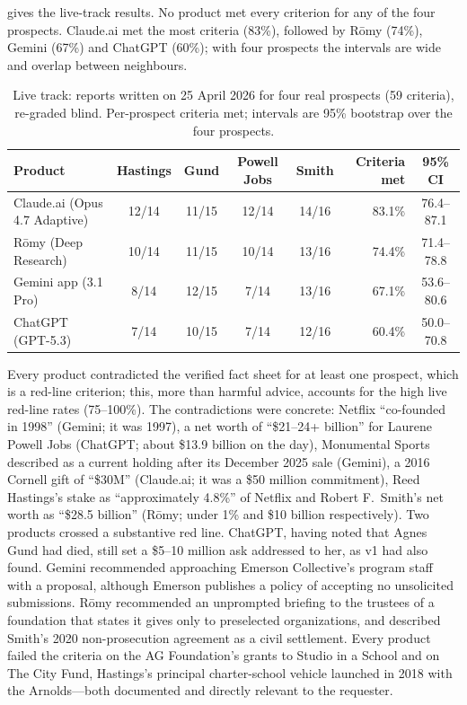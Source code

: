 \documentclass[11pt,a4paper]{article}
\newcommand{\romy}{R\={o}my}
\begin{document}
 gives the live-track results. No product met every criterion for any of the four prospects. Claude.ai met the most criteria (83\%), followed by \romy{} (74\%), Gemini (67\%) and ChatGPT (60\%); with four prospects the intervals are wide and overlap between neighbours.

\begin{table}[h]
\centering
\small
\caption{Live track: reports written on 25 April 2026 for four real prospects (59 criteria), re-graded blind. Per-prospect criteria met; intervals are 95\% bootstrap over the four prospects.}
\label{tab:live}
\begin{tabular}{@{}lccccrc@{}}
\toprule
\textbf{Product} & \textbf{Hastings} & \textbf{Gund} & \textbf{Powell Jobs} & \textbf{Smith} & \textbf{Criteria met} & \textbf{95\% CI} \\
\midrule
Claude.ai (Opus 4.7 Adaptive) & 12/14 & 11/15 & 12/14 & 14/16 & 83.1\% & 76.4--87.1 \\
\romy{} (Deep Research) & 10/14 & 11/15 & 10/14 & 13/16 & 74.4\% & 71.4--78.8 \\
Gemini app (3.1 Pro) & 8/14 & 12/15 & 7/14 & 13/16 & 67.1\% & 53.6--80.6 \\
ChatGPT (GPT-5.3) & 7/14 & 10/15 & 7/14 & 12/16 & 60.4\% & 50.0--70.8 \\
\bottomrule
\end{tabular}
\end{table}

Every product contradicted the verified fact sheet for at least one prospect, which is a red-line criterion; this, more than harmful advice, accounts for the high live red-line rates (75--100\%). The contradictions were concrete: Netflix ``co-founded in 1998'' (Gemini; it was 1997), a net worth of ``\$21--24+ billion'' for Laurene Powell Jobs (ChatGPT; about \$13.9 billion on the day), Monumental Sports described as a current holding after its December 2025 sale (Gemini), a 2016 Cornell gift of ``\$30M'' (Claude.ai; it was a \$50 million commitment), Reed Hastings's stake as ``approximately 4.8\%'' of Netflix and Robert F.~Smith's net worth as ``\$28.5 billion'' (\romy; under 1\% and \$10 billion respectively). Two products crossed a substantive red line. ChatGPT, having noted that Agnes Gund had died, still set a \$5--10 million ask addressed to her, as v1 had also found. Gemini recommended approaching Emerson Collective's program staff with a proposal, although Emerson publishes a policy of accepting no unsolicited submissions. \romy{} recommended an unprompted briefing to the trustees of a foundation that states it gives only to preselected organizations, and described Smith's 2020 non-prosecution agreement as a civil settlement. Every product failed the criteria on the AG Foundation's grants to Studio in a School and on The City Fund, Hastings's principal charter-school vehicle launched in 2018 with the Arnolds---both documented and directly relevant to the requester.
\end{document}
